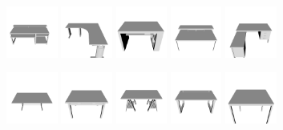 \begin{figure}[!t]
	\centering
	\includegraphics[width=0.15\textwidth]{Figures/ObjRecog/desk_0}\hfill
	\includegraphics[width=0.15\textwidth]{Figures/ObjRecog/desk_1}\hfill
	\includegraphics[width=0.15\textwidth]{Figures/ObjRecog/desk_2}\hfill
	\includegraphics[width=0.15\textwidth]{Figures/ObjRecog/desk_3}\hfill
	\includegraphics[width=0.15\textwidth]{Figures/ObjRecog/desk_4}\hfill

	\includegraphics[width=0.15\textwidth]{Figures/ObjRecog/table_0}\hfill
	\includegraphics[width=0.15\textwidth]{Figures/ObjRecog/table_1}\hfill
	\includegraphics[width=0.15\textwidth]{Figures/ObjRecog/table_2}\hfill
	\includegraphics[width=0.15\textwidth]{Figures/ObjRecog/table_3}\hfill
	\includegraphics[width=0.15\textwidth]{Figures/ObjRecog/table_4}\hfill


\end{figure}
